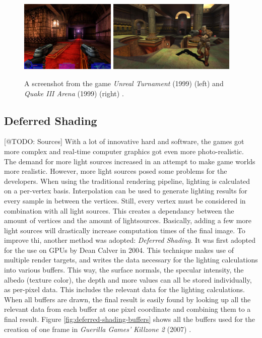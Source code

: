 \begin{figure}[h]
    \centering
    \includegraphics[width=172.5px]{images/graphics/unreal-turnament.jpg}
    \includegraphics[width=230px]{images/graphics/quake-iii-arena.jpg}
    \caption{A screenshot from the game \emph{Unreal Turnament} (1999) (left) and \emph{Quake III Arena} (1999) 
    (right) \cite{GamespotUnrealTurnament, GameWatcher2006}.}
    \label{fig:unreal-turnament-quake-arena}
\end{figure}


\subsection*{Deferred Shading} \label{subsec-deferred-rendering}

[@TODO: Sources]
With a lot of innovative hard and software, the games got more complex and real-time computer graphics got even more 
photo-realistic. The demand for more light sources increased in an attempt to make game worlds more realistic. 
However, more light sources posed some problems for the developers. When using the traditional rendering pipeline,
lighting is calculated on a per-vertex basis. Interpolation can be used to generate lighting results for every sample 
in between the vertices. Still, every vertex must be considered in combination with all light sources. This creates a 
dependancy between the amount of vertices and the amount of lightsources. Basically, adding a few more light sources 
will drastically increase computation times of the final image. To improve thi, another method was adopted: \emph{Deferred Shading}.
It was first adopted for the use on \ac{GPU}s by Dean Calver \cite{Calver2004} in 2004. This technique makes use of 
multiple render targets, and writes the data necessary for the lighting calculations into various buffers. This way, 
the surface normals, the specular intensity, the albedo (texture color), the depth and more values can all be stored 
individually, as per-pixel data. This includes the relevant data for the lighting calculations. When all buffers are 
drawn, the final result is easily found by looking up all the relevant data from each buffer at one pixel coordinate 
and combining them to a final result. Figure \ref{fig:deferred-shading-buffers} shows all the buffers used for the 
creation of one frame in \emph{Guerilla Games'} \emph{Killzone 2} (2007) \cite{KillzoneFandom}. 

